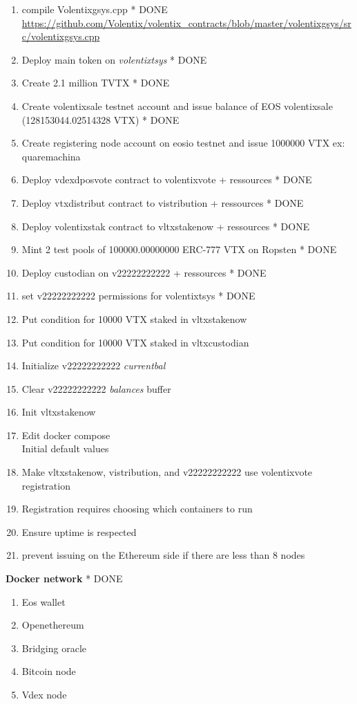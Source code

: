 \documentclass[]{article}
\begin{document}
  		\begin{enumerate}
  			\item compile Volentixgsys.cpp * {\color{green} DONE}\\ 
  			\url{https://github.com/Volentix/volentix_contracts/blob/master/volentixgsys/src/volentixgsys.cpp} 
  		  \item Deploy main token on \textit{volentixtsys} * {\color{green} DONE}
  		  \item Create 2.1 million TVTX * {\color{green} DONE}
  		  \item Create volentixsale testnet account and issue balance of EOS volentixsale (128153044.02514328 VTX) * {\color{green} DONE}
  		   \item Create registering node account on eosio testnet and issue 1000000 VTX ex: quaremachina
  		  \item Deploy vdexdposvote contract to volentixvote + ressources * {\color{green} DONE}
  		  \item Deploy vtxdistribut contract to vistribution + ressources * {\color{green} DONE}
  		  \item Deploy volentixstak  contract to vltxstakenow + ressources * {\color{green} DONE}
 		  \item Mint 2 test pools of 100000.00000000 ERC-777 VTX on Ropsten  * {\color{green} DONE}
		  \item Deploy custodian on v22222222222 + ressources  * {\color{green} DONE}
		  \item set v22222222222 permissions for volentixtsys * {\color{green} DONE}
		  \item Put condition for 10000 VTX staked in vltxstakenow
		  \item Put condition for 10000 VTX staked in vltxcustodian
		  \item Initialize v22222222222 \textit{currentbal}
		  \item Clear v22222222222 \textit{balances} buffer
		  \item Init vltxstakenow
		  \item Edit docker compose\\
		  Initial default values		
		  \item Make vltxstakenow, vistribution, and v22222222222 use volentixvote registration
		  \item Registration requires choosing which containers to run 
		 
		  \item Ensure uptime is respected 
		  \item prevent issuing on the Ethereum side if there are less than 8 nodes
		   
	 \end{enumerate}
   \textbf{Docker network}	  * {\color{green} DONE}
  \begin{enumerate}
  	\item Eos wallet
  	\item Openethereum
  	\item Bridging oracle
  	\item Bitcoin node
  	\item Vdex node
  \end{enumerate}
\end{document}
